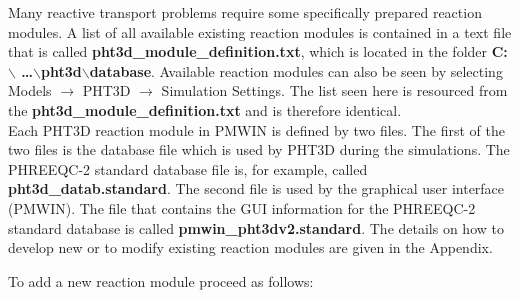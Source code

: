 Many reactive transport problems require some specifically prepared reaction modules.
A list of all available existing reaction modules is contained in a text file
that is called {\color{red} \textbf{pht3d\_module\_definition.txt}}, which is located in 
the folder {\color{red} \textbf{C:$\backslash$ \ldots $\backslash$pht3d$\backslash$database}}.
Available reaction modules can also be seen by selecting Models $\rightarrow$ PHT3D 
$\rightarrow$ Simulation Settings. The list seen here is resourced from
the {\color{red} \textbf{pht3d\_module\_definition.txt}} and is therefore identical.
\\
Each PHT3D reaction module in PMWIN is defined by two files.
The first of the two files is the database file which is used by PHT3D 
during the simulations. The PHREEQC-2 standard database file is, 
for example, called {\color{red} \textbf{pht3d\_datab.standard}}. 
The second file is used by the graphical 
user interface (PMWIN). The file that contains the GUI information
for the PHREEQC-2 standard database is called {\color{red} \textbf{pmwin\_pht3dv2.standard}}.
The details on how to develop new or to modify existing reaction modules
are given in the Appendix.

To add a new reaction module proceed as follows:

